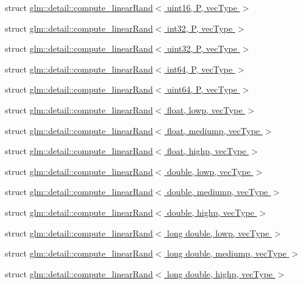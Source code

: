 \begin{DoxyCompactItemize}
\item 
struct \hyperlink{structglm_1_1detail_1_1compute__linear_rand_3_01uint16_00_01_p_00_01vec_type_01_4}{glm\+::detail\+::compute\+\_\+linear\+Rand$<$ uint16, P, vec\+Type $>$}
\item 
struct \hyperlink{structglm_1_1detail_1_1compute__linear_rand_3_01int32_00_01_p_00_01vec_type_01_4}{glm\+::detail\+::compute\+\_\+linear\+Rand$<$ int32, P, vec\+Type $>$}
\item 
struct \hyperlink{structglm_1_1detail_1_1compute__linear_rand_3_01uint32_00_01_p_00_01vec_type_01_4}{glm\+::detail\+::compute\+\_\+linear\+Rand$<$ uint32, P, vec\+Type $>$}
\item 
struct \hyperlink{structglm_1_1detail_1_1compute__linear_rand_3_01int64_00_01_p_00_01vec_type_01_4}{glm\+::detail\+::compute\+\_\+linear\+Rand$<$ int64, P, vec\+Type $>$}
\item 
struct \hyperlink{structglm_1_1detail_1_1compute__linear_rand_3_01uint64_00_01_p_00_01vec_type_01_4}{glm\+::detail\+::compute\+\_\+linear\+Rand$<$ uint64, P, vec\+Type $>$}
\item 
struct \hyperlink{structglm_1_1detail_1_1compute__linear_rand_3_01float_00_01lowp_00_01vec_type_01_4}{glm\+::detail\+::compute\+\_\+linear\+Rand$<$ float, lowp, vec\+Type $>$}
\item 
struct \hyperlink{structglm_1_1detail_1_1compute__linear_rand_3_01float_00_01mediump_00_01vec_type_01_4}{glm\+::detail\+::compute\+\_\+linear\+Rand$<$ float, mediump, vec\+Type $>$}
\item 
struct \hyperlink{structglm_1_1detail_1_1compute__linear_rand_3_01float_00_01highp_00_01vec_type_01_4}{glm\+::detail\+::compute\+\_\+linear\+Rand$<$ float, highp, vec\+Type $>$}
\item 
struct \hyperlink{structglm_1_1detail_1_1compute__linear_rand_3_01double_00_01lowp_00_01vec_type_01_4}{glm\+::detail\+::compute\+\_\+linear\+Rand$<$ double, lowp, vec\+Type $>$}
\item 
struct \hyperlink{structglm_1_1detail_1_1compute__linear_rand_3_01double_00_01mediump_00_01vec_type_01_4}{glm\+::detail\+::compute\+\_\+linear\+Rand$<$ double, mediump, vec\+Type $>$}
\item 
struct \hyperlink{structglm_1_1detail_1_1compute__linear_rand_3_01double_00_01highp_00_01vec_type_01_4}{glm\+::detail\+::compute\+\_\+linear\+Rand$<$ double, highp, vec\+Type $>$}
\item 
struct \hyperlink{structglm_1_1detail_1_1compute__linear_rand_3_01long_01double_00_01lowp_00_01vec_type_01_4}{glm\+::detail\+::compute\+\_\+linear\+Rand$<$ long double, lowp, vec\+Type $>$}
\item 
struct \hyperlink{structglm_1_1detail_1_1compute__linear_rand_3_01long_01double_00_01mediump_00_01vec_type_01_4}{glm\+::detail\+::compute\+\_\+linear\+Rand$<$ long double, mediump, vec\+Type $>$}
\item 
struct \hyperlink{structglm_1_1detail_1_1compute__linear_rand_3_01long_01double_00_01highp_00_01vec_type_01_4}{glm\+::detail\+::compute\+\_\+linear\+Rand$<$ long double, highp, vec\+Type $>$}
\end{DoxyCompactItemize}
